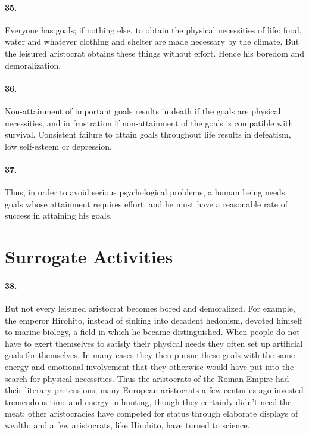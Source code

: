 \documentclass[12pt]{book}
\newcommand{\mysection}[1]{\section*{#1} \addcontentsline{toc}{section}{#1}}
\begin{document}
\paragraph{35.} Everyone has goals; if nothing else, to obtain the physical necessities of life: food, water and whatever clothing and shelter are made necessary by the climate. But the leisured aristocrat obtains these things without effort. Hence his boredom and demoralization.


\paragraph{36.}  Non-attainment of important goals results in death if the goals are physical necessities, and in frustration if non-attainment of the goals is compatible with survival. Consistent failure to attain goals throughout life results in defeatism, low self-esteem or depression.


\paragraph{37.} Thus, in order to avoid serious psychological problems, a human being needs goals whose attainment requires effort, and he must have a reasonable rate of success in attaining his goals.

\mysection{Surrogate Activities}


\paragraph{38.} But not every leisured aristocrat becomes bored and demoralized. For example, the emperor Hirohito, instead of sinking into decadent hedonism, devoted himself to marine biology, a field in which he became distinguished.  When people do not have to exert themselves to satisfy their physical needs they often set up artificial goals for themselves. In many cases they then pursue these goals with the same energy and emotional involvement that they otherwise would have put into the search for physical necessities.  Thus the aristocrats of the Roman Empire had their literary pretensions; many European aristocrats a few centuries ago invested tremendous time and energy in hunting, though they certainly didn't need the meat; other aristocracies have competed for status through elaborate displays of wealth; and a few aristocrats, like Hirohito, have turned to science.
\end{document}
